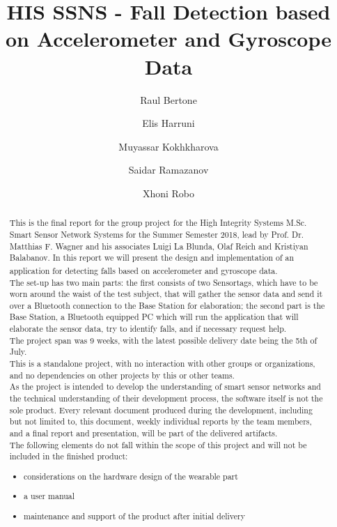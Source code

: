 \documentclass[hidelinks,conference,12pt]{IEEETran}
\title{HIS SSNS - Fall Detection based on Accelerometer and Gyroscope Data}
\author{
	 Raul Bertone
\and Elis Harruni
\and Muyassar Kokhkharova
\and Saidar Ramazanov
\and Xhoni Robo
}
\begin{document}
\maketitle

\begin{abstract}

This is the final report for the group project for the High Integrity Systems M.Sc. Smart Sensor Network Systems for the Summer Semester 2018, lead by Prof. Dr. Matthias F. Wagner and his associates Luigi La Blunda, Olaf Reich and Kristiyan Balabanov. In this report we will present the design and implementation of an application for detecting falls based on accelerometer and gyroscope data\textsuperscript{\cite{lablunda}}.\\
The set-up has two main parts: the first consists of two Sensortags, which have to be worn around the waist of the test subject, that will gather the sensor data and send it over a Bluetooth connection to the Base Station for elaboration; the second part is the Base Station, a Bluetooth equipped PC which will run the application that will elaborate the sensor data, try to identify falls, and if necessary request help.\\
The project span was 9 weeks, with the latest possible delivery date being the 5th of July.\\
This is a standalone project, with no interaction with other groups or organizations, and no dependencies on other projects by this or other teams.\\
As the project is intended to develop the understanding of smart sensor networks and the technical understanding of their development process, the software itself is not the sole product. Every relevant document produced during the development, including but not limited to, this document, weekly individual reports by the team members, and a final report and presentation, will be part of the delivered artifacts.\\
The following elements do not fall within the scope of this project and will not be included in the finished product:
\begin{itemize}
	\item considerations on the hardware design of the wearable part
	\item a user manual
	\item maintenance and support of the product after initial delivery
\end{itemize}	
\end{abstract}
\end{document}
